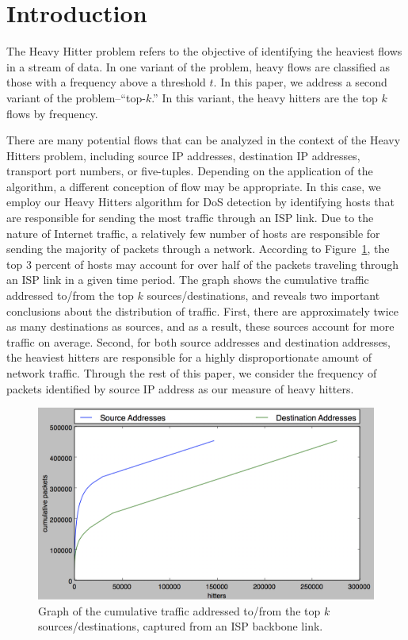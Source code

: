 \section{Introduction}
\label{sec:intro}
The Heavy Hitter problem refers to the objective of identifying the heaviest flows in a stream of data. In one variant of the problem, heavy flows are classified as those with a frequency above a threshold $t$. In this paper, we address a second variant of the problem--``top-$k$.'' In this variant, the heavy hitters are the top $k$ flows by frequency. 

There are many potential flows that can be analyzed in the context of the Heavy Hitters problem, including source IP addresses, destination IP addresses, transport port numbers, or five-tuples. Depending on the application of the algorithm, a different conception of flow may be appropriate. In this case, we employ our Heavy Hitters algorithm for DoS detection by identifying hosts that are responsible for sending the most traffic through an ISP link. Due to the nature of Internet traffic, a relatively few number of hosts are responsible for sending the majority of packets through a network. According to Figure~\ref{fig:cumulative}, the top 3 percent of hosts may account for over half of the packets traveling through an ISP link in a given time period. The graph shows the cumulative traffic addressed to/from the top $k$ sources/destinations, and reveals two important conclusions about the distribution of traffic. First, there are approximately twice as many destinations as sources, and as a result, these sources account for more traffic on average. Second, for both source addresses and destination addresses, the heaviest hitters are responsible for a highly disproportionate amount of network traffic. Through the rest of this paper, we consider the frequency of packets identified by source IP address as our measure of heavy hitters.
\begin{figure}[t]
  \centering
    \includegraphics[scale=0.3]{cumulative}
     \caption{Graph of the cumulative traffic addressed to/from the top $k$ sources/destinations, captured from an ISP backbone link.}
     \label{fig:cumulative}
\end{figure}